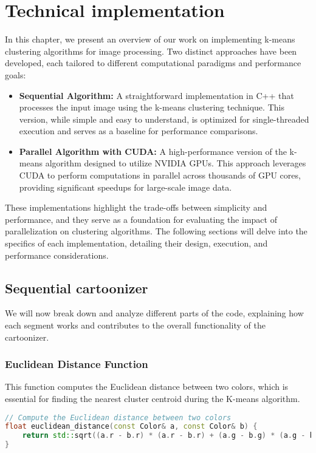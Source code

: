 \chapter{Technical implementation}
In this chapter, we present an overview of our work on implementing k-means clustering algorithms for image processing. Two distinct approaches have been developed, each tailored to different computational paradigms and performance goals:

\begin{itemize}
\item \textbf{Sequential Algorithm:} A straightforward implementation in C++ that processes the input image using the k-means clustering technique. This version, while simple and easy to understand, is optimized for single-threaded execution and serves as a baseline for performance comparisons.
\item \textbf{Parallel Algorithm with CUDA:} A high-performance version of the k-means algorithm designed to utilize NVIDIA GPUs. This approach leverages CUDA to perform computations in parallel across thousands of GPU cores, providing significant speedups for large-scale image data.
\end{itemize}

These implementations highlight the trade-offs between simplicity and performance, and they serve as a foundation for evaluating the impact of parallelization on clustering algorithms. The following sections will delve into the specifics of each implementation, detailing their design, execution, and performance considerations.

\section{Sequential cartoonizer}
We will now break down and analyze different parts of the code, explaining how each segment works and contributes to the overall functionality of the cartoonizer.

\subsection{Euclidean Distance Function}
This function computes the Euclidean distance between two colors, which is essential for finding the nearest cluster centroid during the K-means algorithm.

\begin{lstlisting}[language=C++]
// Compute the Euclidean distance between two colors
float euclidean_distance(const Color& a, const Color& b) {
    return std::sqrt((a.r - b.r) * (a.r - b.r) + (a.g - b.g) * (a.g - b.g) + (a.b - b.b) * (a.b - b.b));
}
\end{lstlisting}

